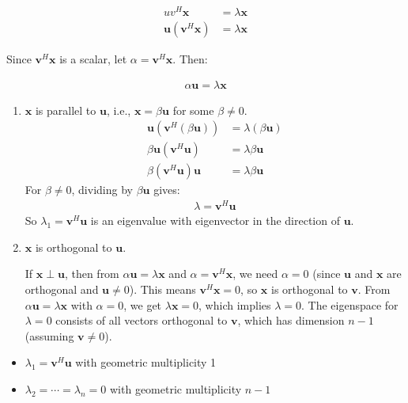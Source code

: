 \begin{align*}
    uv^H \mathbf{x}                     & = \lambda \mathbf{x} \\
    \mathbf{u}(\mathbf{v}^H \mathbf{x}) & = \lambda \mathbf{x}
\end{align*}

Since $\mathbf{v}^H \mathbf{x}$ is a scalar, let $\alpha = \mathbf{v}^H \mathbf{x}$. Then:

\begin{align*}
    \alpha \mathbf{u} = \lambda \mathbf{x}
\end{align*}

\begin{enumerate}
    \item $\mathbf{x}$ is parallel to $\mathbf{u}$, i.e., $\mathbf{x} = \beta \mathbf{u}$ for some $\beta \neq 0$.
          \begin{align*}
              \mathbf{u}(\mathbf{v}^H (\beta \mathbf{u})) & = \lambda (\beta \mathbf{u}) \\
              \beta \mathbf{u}(\mathbf{v}^H \mathbf{u})   & = \lambda \beta \mathbf{u}   \\
              \beta (\mathbf{v}^H \mathbf{u}) \mathbf{u}  & = \lambda \beta \mathbf{u}
          \end{align*}
          For $\beta \neq 0$, dividing by $\beta \mathbf{u}$ gives:
          \begin{align*}
              \lambda = \mathbf{v}^H \mathbf{u}
          \end{align*}
          So $\lambda_1 = \mathbf{v}^H \mathbf{u}$ is an eigenvalue with eigenvector in the direction of $\mathbf{u}$.
    \item $\mathbf{x}$ is orthogonal to $\mathbf{u}$.

          If $\mathbf{x} \perp \mathbf{u}$, then from $\alpha \mathbf{u} = \lambda \mathbf{x}$ and $\alpha = \mathbf{v}^H \mathbf{x}$, we need $\alpha = 0$ (since $\mathbf{u}$ and $\mathbf{x}$ are orthogonal and $\mathbf{u} \neq 0$).
          This means $\mathbf{v}^H \mathbf{x} = 0$, so $\mathbf{x}$ is orthogonal to $\mathbf{v}$. From $\alpha \mathbf{u} = \lambda \mathbf{x}$ with $\alpha = 0$, we get $\lambda \mathbf{x} = 0$, which implies $\lambda = 0$.
          The eigenspace for $\lambda = 0$ consists of all vectors orthogonal to $\mathbf{v}$, which has dimension $n-1$ (assuming $\mathbf{v} \neq 0$).
\end{enumerate}

\begin{itemize}
    \item  $\lambda_1 = \mathbf{v}^H \mathbf{u}$ with geometric multiplicity 1
    \item  $\lambda_2 = \cdots = \lambda_n = 0$ with geometric multiplicity $n-1$
\end{itemize}

